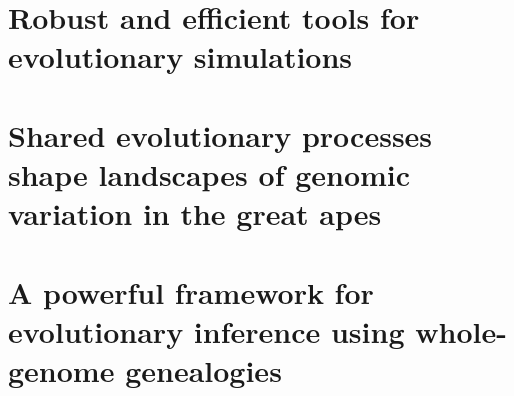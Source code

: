 







\chapter{Robust and efficient tools for evolutionary simulations} \label{chapter:tools}


\chapter{Shared evolutionary processes shape landscapes of genomic variation in the great apes} \label{chapter:greatapes}


\chapter{A powerful framework for evolutionary inference using whole-genome genealogies} \label{chapter:tsnn}







